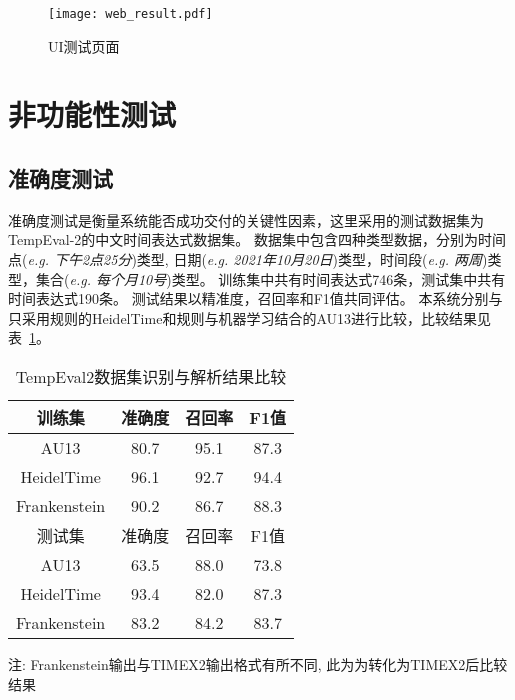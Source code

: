 \begin{figure}[h]
    \centering
    \texttt{[image: web\_result.pdf]}
    \caption{UI测试页面}
    \label{fig:web_result}
\end{figure}

\section{非功能性测试}

\subsection{准确度测试}

准确度测试是衡量系统能否成功交付的关键性因素，这里采用的测试数据集为TempEval-2\cite{verhagen-etal-2010-semeval}的中文时间表达式数据集。
数据集中包含四种类型数据，分别为时间点(\textit{e.g. 下午2点25分})类型, 日期(\textit{e.g. 2021年10月20日})类型，时间段(\textit{e.g. 两周})类型，集合(\textit{e.g. 每个月10号})类型。
训练集中共有时间表达式746条，测试集中共有时间表达式190条。
测试结果以精准度，召回率和F1值共同评估。
本系统分别与只采用规则的HeidelTime\cite{strotgen2010heideltime}和规则与机器学习结合的AU13\cite{angeli-uszkoreit-2013-language}进行比较，比较结果见表~\ref{tab:test_compare}。

\begin{table}[h]
    \centering
    \caption{TempEval2数据集识别与解析结果比较}
    \begin{tabular}{*{4}{c}}
        \toprule
        训练集       & 准确度 & 召回率 & F1值 \\
        \midrule
        AU13         & 80.7   & 95.1   & 87.3 \\
        HeidelTime   & 96.1   & 92.7   & 94.4 \\
        Frankenstein & 90.2   & 86.7   & 88.3 \\
        \midrule
        测试集       & 准确度 & 召回率 & F1值 \\
        \midrule
        AU13   & 63.5   & 88.0   & 73.8 \\
        HeidelTime   & 93.4   & 82.0   & 87.3 \\
        Frankenstein & 83.2   & 84.2   & 83.7 \\
        \bottomrule
    \end{tabular}
    \begin{tablenotes}
        \footnotesize
        \item 注: Frankenstein输出与TIMEX2输出格式有所不同, 此为为转化为TIMEX2后比较结果
    \end{tablenotes}
    \label{tab:test_compare}
\end{table}

